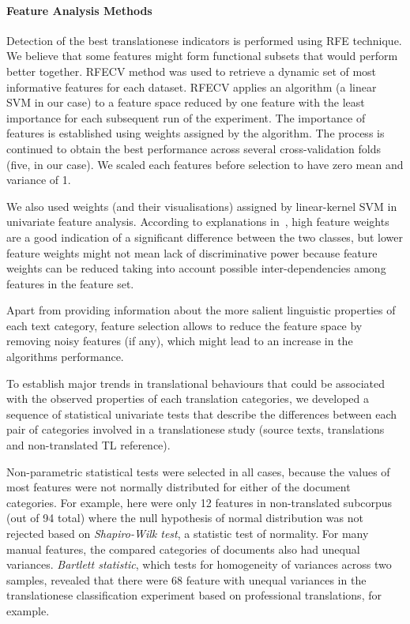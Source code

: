 \paragraph{Feature Analysis Methods}
Detection of the best translationese indicators is performed using \gls{RFE} technique. 
We believe that some features might form functional subsets that would perform better together. \gls{RFECV} method was used to retrieve a dynamic set of most informative features for each dataset. 
\gls{RFECV} applies an algorithm (a linear SVM in our case) to a feature space reduced by one feature with the least importance for each subsequent run of the experiment. The importance of features is established using weights assigned by the algorithm. The process is continued to obtain the best performance across several cross-validation folds (five, in our case). We scaled each features before selection to have zero mean and variance of 1. 

We also used weights (and their visualisations) assigned by linear-kernel SVM in univariate feature analysis. According to explanations in~\citet{Volansky2015}, high feature weights are a good indication of a significant difference between the two classes, but lower feature weights might not mean lack of discriminative power because feature weights can be reduced taking into account possible inter-dependencies among features in the feature set.  

Apart from providing information about the more salient linguistic properties of each text category, feature selection allows to reduce the feature space by removing noisy features (if any), which might lead to an increase in the algorithms performance.

To establish major trends in translational behaviours that could be associated with the observed properties of each translation categories, we developed a sequence of statistical univariate tests that describe the  differences between each pair of categories involved in a translationese study (source texts, translations and non-translated TL reference).

Non-parametric statistical tests were selected in all cases, because the values of most features were not normally distributed for either of the document categories. For example, here were only 12 features in non-translated subcorpus (out of 94 total) where the null hypothesis of normal distribution was not rejected based on \textit{Shapiro-Wilk test}, a statistic test of normality.
For many manual features, the compared categories of documents also had unequal variances.   
\textit{Bartlett statistic}, which tests for homogeneity of variances across two samples, revealed that there were 68 feature with unequal variances in the translationese classification experiment based on professional translations, for example. 

